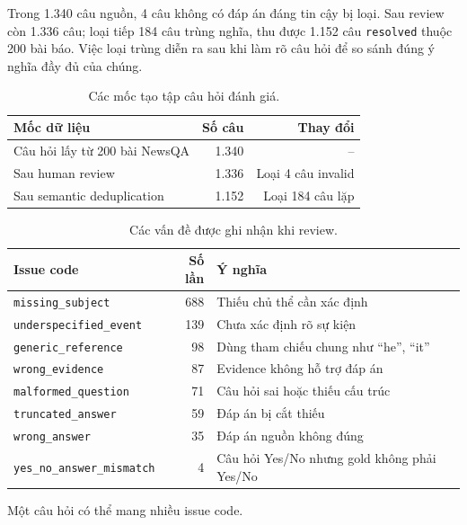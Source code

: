 Trong 1.340 câu nguồn, 4 câu không có đáp án đáng tin cậy bị loại. Sau review
còn 1.336 câu; loại tiếp 184 câu trùng nghĩa, thu được 1.152 câu
\texttt{resolved} thuộc 200 bài báo. Việc loại trùng diễn ra sau khi làm rõ câu
hỏi để so sánh đúng ý nghĩa đầy đủ của chúng.

\begin{table}[htbp]
  \centering
  \caption{Các mốc tạo tập câu hỏi đánh giá.}
  \label{tab:dataset-preparation}
  \begin{tabularx}{0.86\textwidth}{@{}Xrr@{}}
    \toprule
    \textbf{Mốc dữ liệu} & \textbf{Số câu} & \textbf{Thay đổi} \\
    \midrule
    Câu hỏi lấy từ 200 bài NewsQA & 1.340 & -- \\
    Sau human review & 1.336 & Loại 4 câu invalid \\
    Sau semantic deduplication & 1.152 & Loại 184 câu lặp \\
    \bottomrule
  \end{tabularx}
\end{table}

\begin{table}[htbp]
  \centering
  \caption{Các vấn đề được ghi nhận khi review.}
  \label{tab:question-review-issues}
  \begin{tabularx}{\textwidth}{@{}l r X@{}}
    \toprule
    \textbf{Issue code} & \textbf{Số lần} & \textbf{Ý nghĩa} \\
    \midrule
    \texttt{missing\_subject} & 688 & Thiếu chủ thể cần xác định \\
    \texttt{underspecified\_event} & 139 & Chưa xác định rõ sự kiện \\
    \texttt{generic\_reference} & 98 & Dùng tham chiếu chung như ``he'', ``it'' \\
    \texttt{wrong\_evidence} & 87 & Evidence không hỗ trợ đáp án \\
    \texttt{malformed\_question} & 71 & Câu hỏi sai hoặc thiếu cấu trúc \\
    \texttt{truncated\_answer} & 59 & Đáp án bị cắt thiếu \\
    \texttt{wrong\_answer} & 35 & Đáp án nguồn không đúng \\
    \texttt{yes\_no\_answer\_mismatch} & 4 & Câu hỏi Yes/No nhưng gold không phải Yes/No \\
    \bottomrule
  \end{tabularx}

  \vspace{1mm}
  {\footnotesize Một câu hỏi có thể mang nhiều issue code.}
\end{table}

